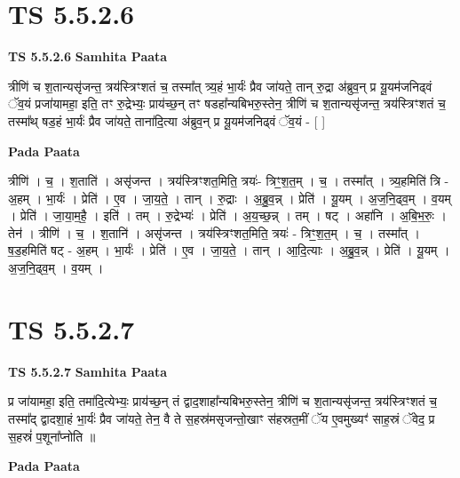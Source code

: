 \documentclass[17pt]{extarticle}
\begin{document}
\section{ TS 5.5.2.6 }

\textbf{TS 5.5.2.6 } \newline
\textbf{Samhita Paata} \newline

त्रीणि॑ च श॒तान्यसृ॑जन्त॒ त्रय॑स्त्रिꣳशतं च॒ तस्मा᳚त् त्र्य॒हं भा॒र्यः॑ प्रैव जा॑यते॒ तान् रु॒द्रा अ॑ब्रुव॒न् प्र यू॒यम॑जनिढ्वं ॅव॒यं प्रजा॑यामहा॒ इति॒ तꣳ रु॒द्रेभ्यः॒ प्राय॑च्छ॒न् तꣳ षडहा᳚न्यबिभरु॒स्तेन॒ त्रीणि॑ च श॒तान्यसृ॑जन्त॒ त्रय॑स्त्रिꣳशतं च॒ तस्मा᳚थ् षड॒हं भा॒र्यः॑ प्रैव जा॑यते॒ ताना॑दि॒त्या अ॑ब्रुव॒न् प्र यू॒यम॑जनिढ्वं ॅव॒यं - [  ] \newline

\textbf{Pada Paata} \newline

त्रीणि॑ । च॒ । श॒ताति॑ । असृ॑जन्त । त्रय॑स्त्रिꣳशत॒मिति॒ त्रयः॑- त्रिꣳ॒॒श॒त॒म् । च॒ । तस्मा᳚त् । त्र्य॒हमिति॑ त्रि - अ॒हम् । भा॒र्यः॑ । प्रेति॑ । ए॒व । जा॒य॒ते॒ । तान् । रु॒द्राः । अ॒ब्रु॒व॒न्न् । प्रेति॑ । यू॒यम् । अ॒ज॒नि॒ढ्व॒म् । व॒यम् । प्रेति॑ । जा॒या॒म॒है॒ । इति॑ । तम् । रु॒द्रेभ्यः॑ । प्रेति॑ । अ॒य॒च्छ॒न्न् । तम् । षट् । अहा॑नि । अ॒बि॒भ॒रुः॒ । तेन॑ । त्रीणि॑ । च॒ । श॒तानि॑ । असृ॑जन्त । त्रय॑स्त्रिꣳशत॒मिति॒ त्रयः॑ - त्रिꣳ॒॒श॒त॒म् । च॒ । तस्मा᳚त् । ष॒ड॒हमिति॑ षट् - अ॒हम् । भा॒र्यः॑ । प्रेति॑ । ए॒व । जा॒य॒ते॒ । तान् । आ॒दि॒त्याः । अ॒ब्रु॒व॒न्न् । प्रेति॑ । यू॒यम् । अ॒ज॒नि॒ढ्व॒म् । व॒यम् ।  \newline





\section{ TS 5.5.2.7 }

\textbf{TS 5.5.2.7 } \newline
\textbf{Samhita Paata} \newline

प्र जा॑यामहा॒ इति॒ तमा॑दि॒त्येभ्यः॒ प्राय॑च्छ॒न् तं द्वाद॒शाहा᳚न्यबिभरु॒स्तेन॒ त्रीणि॑ च श॒तान्यसृ॑जन्त॒ त्रय॑स्त्रिꣳशतं च॒ तस्मा᳚द् द्वादशा॒हं भा॒र्यः॑ प्रैव जा॑यते॒ तेन॒ वै ते स॒हस्र॑मसृजन्तो॒खाꣳ स॑हस्रत॒मीं ॅय ए॒वमुख्यꣳ॑ साह॒स्रं ॅवेद॒ प्र स॒हस्रं॑ प॒शूना᳚प्नोति ॥ \newline

\textbf{Pada Paata} \newline
\end{document}
